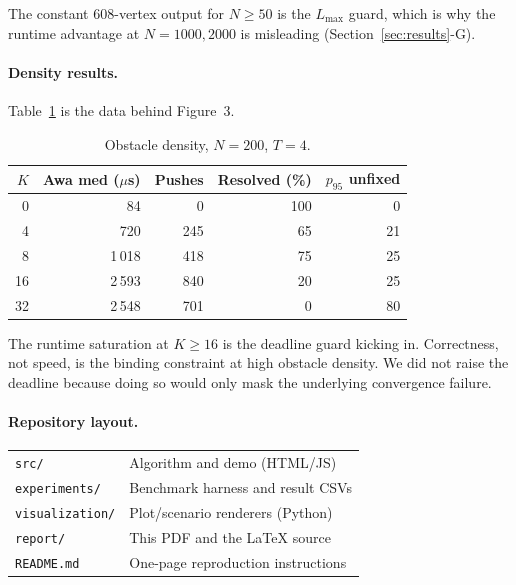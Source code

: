 \documentclass[10pt,a4paper,twocolumn]{article}
\begin{document}
The constant $608$-vertex output for $N{\geq}50$ is the $L_{\max}$
guard, which is why the runtime advantage at $N{=}1000,2000$ is
misleading (Section~\ref{sec:results}-G).

\paragraph*{Density results.}
Table~\ref{tab:appendix-density} is the data behind Figure~3.

\begin{table}[h]\centering\small
\caption{Obstacle density, $N{=}200$, $T{=}4$.}\label{tab:appendix-density}
\begin{tabular}{@{}rrrrr@{}}
\toprule
$K$ & Awa med ($\mu$s) & Pushes & Resolved (\%) & $p_{95}$ unfixed \\
\midrule
 0  &      84 &    0 & 100 &  0 \\
 4  &     720 &  245 &  65 & 21 \\
 8  &  1\,018 &  418 &  75 & 25 \\
16  &  2\,593 &  840 &  20 & 25 \\
32  &  2\,548 &  701 &   0 & 80 \\
\bottomrule
\end{tabular}
\end{table}

The runtime saturation at $K{\geq}16$ is the deadline guard kicking in.
Correctness, not speed, is the binding constraint at high obstacle
density. We did not raise the deadline because doing so would only
mask the underlying convergence failure.

\paragraph*{Repository layout.}
\begin{center}\small
\begin{tabular}{@{}lp{}@{}}
\toprule
\texttt{src/}            & Algorithm and demo (HTML/JS) \\
\texttt{experiments/}    & Benchmark harness and result CSVs \\
\texttt{visualization/}  & Plot/scenario renderers (Python) \\
\texttt{report/}         & This PDF and the LaTeX source \\
\texttt{README.md}       & One-page reproduction instructions \\
\bottomrule
\end{tabular}
\end{center}
\end{document}
